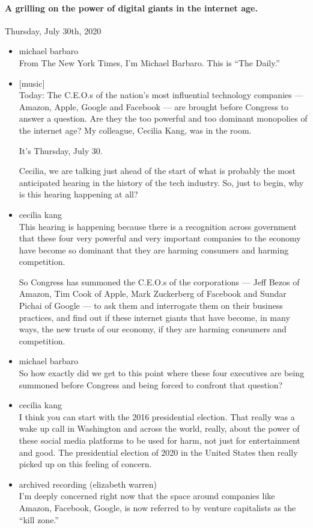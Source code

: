 \hypertarget{a-grilling-on-the-power-of-digital-giants-in-the-internet-age}{%
\paragraph{A grilling on the power of digital giants in the internet
age.}\label{a-grilling-on-the-power-of-digital-giants-in-the-internet-age}}

Thursday, July 30th, 2020

\begin{itemize}
\item
  michael barbaro\\
  From The New York Times, I'm Michael Barbaro. This is ``The Daily.''
\item
  {[}music{]}\\
  Today: The C.E.O.s of the nation's most influential technology
  companies --- Amazon, Apple, Google and Facebook --- are brought
  before Congress to answer a question. Are they the too powerful and
  too dominant monopolies of the internet age? My colleague, Cecilia
  Kang, was in the room.

  It's Thursday, July 30.

  Cecilia, we are talking just ahead of the start of what is probably
  the most anticipated hearing in the history of the tech industry. So,
  just to begin, why is this hearing happening at all?
\item
  cecilia kang\\
  This hearing is happening because there is a recognition across
  government that these four very powerful and very important companies
  to the economy have become so dominant that they are harming consumers
  and harming competition.

  So Congress has summoned the C.E.O.s of the corporations --- Jeff
  Bezos of Amazon, Tim Cook of Apple, Mark Zuckerberg of Facebook and
  Sundar Pichai of Google --- to ask them and interrogate them on their
  business practices, and find out if these internet giants that have
  become, in many ways, the new trusts of our economy, if they are
  harming consumers and competition.
\item
  michael barbaro\\
  So how exactly did we get to this point where these four executives
  are being summoned before Congress and being forced to confront that
  question?
\item
  cecilia kang\\
  I think you can start with the 2016 presidential election. That really
  was a wake up call in Washington and across the world, really, about
  the power of these social media platforms to be used for harm, not
  just for entertainment and good. The presidential election of 2020 in
  the United States then really picked up on this feeling of concern.
\item
  archived recording (elizabeth warren)\\
  I'm deeply concerned right now that the space around companies like
  Amazon, Facebook, Google, is now referred to by venture capitalists as
  the ``kill zone.''
\end{itemize}

